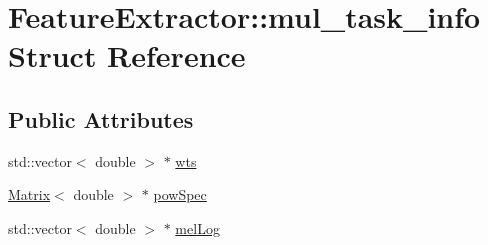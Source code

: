 \hypertarget{struct_feature_extractor_1_1mul__task__info}{\section{Feature\+Extractor\+:\+:mul\+\_\+task\+\_\+info Struct Reference}
\label{struct_feature_extractor_1_1mul__task__info}
}
\subsection*{Public Attributes}
\begin{DoxyCompactItemize}
\item 
std\+::vector$<$ double $>$ $\ast$ \hyperlink{struct_feature_extractor_1_1mul__task__info_a368bf146058e8e717b3e3b9edf36d9a4}{wts}
\item 
\hyperlink{configure__basic_8h_a566a006016cf65b1b01bd2bc633e1c12}{Matrix}$<$ double $>$ $\ast$ \hyperlink{struct_feature_extractor_1_1mul__task__info_a063fda4da896cda16a8e1b92cbcc0b7d}{pow\+Spec}
\item 
std\+::vector$<$ double $>$ $\ast$ \hyperlink{struct_feature_extractor_1_1mul__task__info_ae8fb75892001ccf72456314e79d2d0c1}{mel\+Log}
\end{DoxyCompactItemize}


